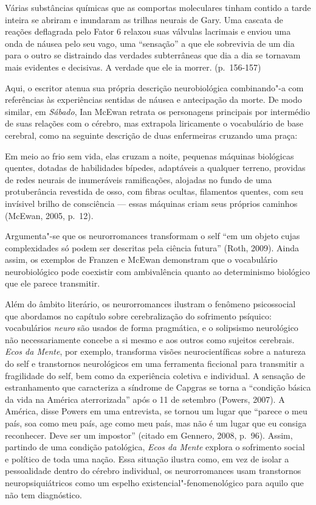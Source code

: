 Várias substâncias químicas que as comportas moleculares tinham contido
a tarde inteira se abriram e inundaram as trilhas neurais de Gary. Uma
cascata de reações deflagrada pelo Fator 6 relaxou suas válvulas
lacrimais e enviou uma onda de náusea pelo seu vago, uma ``sensação'' a
que ele sobrevivia de um dia para o outro se distraindo das verdades
subterrâneas que dia a dia se tornavam mais evidentes e decisivas. A
verdade que ele ia morrer. (p.~156-157)

Aqui, o escritor atenua sua própria descrição neurobiológica
combinando"-a com referências às experiências sentidas de náusea e
antecipação da morte. De modo similar, em \emph{Sábado}, Ian McEwan
retrata os personagens principais por intermédio de suas relações com o
cérebro, mas extrapola liricamente o vocabulário de base cerebral, como
na seguinte descrição de duas enfermeiras cruzando uma praça:

Em meio ao frio sem vida, elas cruzam a noite, pequenas máquinas
biológicas quentes, dotadas de habilidades bípedes, adaptáveis a
qualquer terreno, providas de redes neurais de inumeráveis ramificações,
alojadas no fundo de uma protuberância revestida de osso, com fibras
ocultas, filamentos quentes, com seu invísivel brilho de consciência ---
essas máquinas criam seus próprios caminhos (McEwan, 2005, p.~12).

Argumenta"-se que os neurorromances transformam o self ``em um objeto
cujas complexidades só podem ser descritas pela ciência futura'' (Roth,
2009). Ainda assim, os exemplos de Franzen e McEwan demonstram que o
vocabulário neurobiológico pode coexistir com ambivalência quanto ao
determinismo biológico que ele parece transmitir.

Além do âmbito literário, os neurorromances ilustram o fenômeno
psicossocial que abordamos no capítulo sobre cerebralização do
sofrimento psíquico: vocabulários \emph{neuro} são usados de forma
pragmática, e o solipsismo neurológico não necessariamente concebe a si
mesmo e aos outros como sujeitos cerebrais. \emph{Ecos da Mente}, por
exemplo, transforma visões neurocientíficas sobre a natureza do self e
transtornos neurológicos em uma ferramenta ficcional para transmitir a
fragilidade do self, bem como da experiência coletiva e individual. A
sensação de estranhamento que caracteriza a síndrome de Capgras se torna
a ``condição básica da vida na América aterrorizada'' após o 11 de
setembro (Powers, 2007). A América, disse Powers em uma entrevista, se
tornou um lugar que ``parece o meu país, soa como meu país, age como meu
país, mas não é um lugar que eu consiga reconhecer. Deve ser um
impostor'' (citado em Gennero, 2008, p.~96). Assim, partindo de uma
condição patológica, \emph{Ecos da Mente} explora o sofrimento social e
político de toda uma nação. Essa situação ilustra como, em vez de isolar
a pessoalidade dentro do cérebro individual, os neurorromances usam
transtornos neuropsiquiátricos como um espelho
existencial"-fenomenológico para aquilo que não tem diagnóstico.


